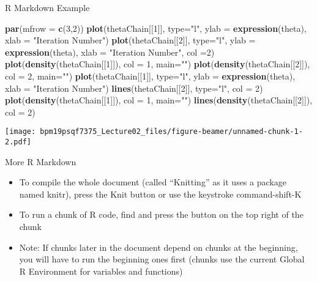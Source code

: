 \documentclass[ignorenonframetext,]{beamer}
\newenvironment{Shaded}{\begin{snugshade}}{\end{snugshade}}
\newcommand{\KeywordTok}[1]{\textcolor[rgb]{0.13,0.29,0.53}{\textbf{#1}}}
\newcommand{\DataTypeTok}[1]{\textcolor[rgb]{0.13,0.29,0.53}{#1}}
\newcommand{\DecValTok}[1]{\textcolor[rgb]{0.00,0.00,0.81}{#1}}
\newcommand{\StringTok}[1]{\textcolor[rgb]{0.31,0.60,0.02}{#1}}
\newcommand{\NormalTok}[1]{#1}
\begin{document}
\begin{frame}[fragile]{R Markdown Example}
\begin{Shaded}
\begin{Highlighting}[]
\KeywordTok{par}\NormalTok{(}\DataTypeTok{mfrow =} \KeywordTok{c}\NormalTok{(}\DecValTok{3}\NormalTok{,}\DecValTok{2}\NormalTok{))}
\KeywordTok{plot}\NormalTok{(thetaChain[[}\DecValTok{1}\NormalTok{]], }\DataTypeTok{type=}\StringTok{"l"}\NormalTok{, }\DataTypeTok{ylab =} \KeywordTok{expression}\NormalTok{(theta), }\DataTypeTok{xlab =} \StringTok{"Iteration Number"}\NormalTok{)}
\KeywordTok{plot}\NormalTok{(thetaChain[[}\DecValTok{2}\NormalTok{]], }\DataTypeTok{type=}\StringTok{"l"}\NormalTok{, }\DataTypeTok{ylab =} \KeywordTok{expression}\NormalTok{(theta), }\DataTypeTok{xlab =} \StringTok{"Iteration Number"}\NormalTok{, }\DataTypeTok{col =}\DecValTok{2}\NormalTok{)}
\KeywordTok{plot}\NormalTok{(}\KeywordTok{density}\NormalTok{(thetaChain[[}\DecValTok{1}\NormalTok{]]), }\DataTypeTok{col =} \DecValTok{1}\NormalTok{, }\DataTypeTok{main=}\StringTok{""}\NormalTok{)}
\KeywordTok{plot}\NormalTok{(}\KeywordTok{density}\NormalTok{(thetaChain[[}\DecValTok{2}\NormalTok{]]), }\DataTypeTok{col =} \DecValTok{2}\NormalTok{, }\DataTypeTok{main=}\StringTok{""}\NormalTok{)}
\KeywordTok{plot}\NormalTok{(thetaChain[[}\DecValTok{1}\NormalTok{]], }\DataTypeTok{type=}\StringTok{"l"}\NormalTok{, }\DataTypeTok{ylab =} \KeywordTok{expression}\NormalTok{(theta), }\DataTypeTok{xlab =} \StringTok{"Iteration Number"}\NormalTok{)}
\KeywordTok{lines}\NormalTok{(thetaChain[[}\DecValTok{2}\NormalTok{]], }\DataTypeTok{type=}\StringTok{"l"}\NormalTok{, }\DataTypeTok{col =} \DecValTok{2}\NormalTok{)}
\KeywordTok{plot}\NormalTok{(}\KeywordTok{density}\NormalTok{(thetaChain[[}\DecValTok{1}\NormalTok{]]), }\DataTypeTok{col =} \DecValTok{1}\NormalTok{, }\DataTypeTok{main=}\StringTok{""}\NormalTok{)}
\KeywordTok{lines}\NormalTok{(}\KeywordTok{density}\NormalTok{(thetaChain[[}\DecValTok{2}\NormalTok{]]), }\DataTypeTok{col =} \DecValTok{2}\NormalTok{)}
\end{Highlighting}
\end{Shaded}

\texttt{[image: bpm19psqf7375\_Lecture02\_files/figure-beamer/unnamed-chunk-1-2.pdf]}

\end{frame}

\begin{frame}{More R Markdown}

\begin{itemize}
\item
  To compile the whole document (called ``Knitting'' as it uses a
  package named knitr), press the Knit button or use the keystroke
  command-shift-K
\item
  To run a chunk of R code, find and press the button on the top right
  of the chunk
\item
  Note: If chunks later in the document depend on chunks at the
  beginning, you will have to run the beginning ones first (chunks use
  the current Global R Environment for variables and functions)
\end{itemize}

\end{frame}
\end{document}
